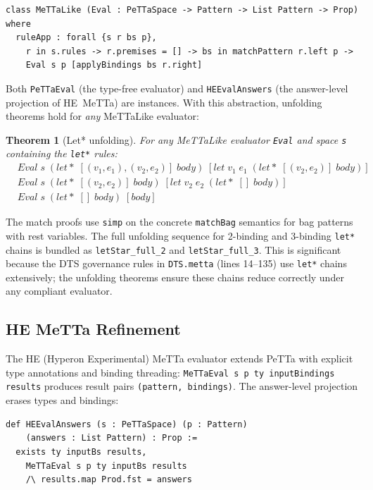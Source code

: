 \documentclass[]{article}
\newtheorem{theorem}{Theorem}
\newcommand{\code}[1]{\texttt{#1}}
\begin{document}
\begin{lstlisting}
class MeTTaLike (Eval : PeTTaSpace -> Pattern -> List Pattern -> Prop) where
  ruleApp : forall {s r bs p},
    r in s.rules -> r.premises = [] -> bs in matchPattern r.left p ->
    Eval s p [applyBindings bs r.right]
\end{lstlisting}

\noindent
Both \code{PeTTaEval} (the type-free evaluator) and \code{HEEvalAnswers}
(the answer-level projection of HE~MeTTa) are instances.
With this abstraction, unfolding theorems hold for \emph{any} MeTTaLike evaluator:

\begin{theorem}[Let* unfolding]
For any MeTTaLike evaluator \code{Eval} and space \code{s} containing the
\code{let*} rules:
\begin{align*}
  &\mathit{Eval}\;s\;(\mathit{let*}\;[(v_1, e_1), (v_2, e_2)]\;\mathit{body})
    \;[\mathit{let}\;v_1\;e_1\;(\mathit{let*}\;[(v_2, e_2)]\;\mathit{body})] \\
  &\mathit{Eval}\;s\;(\mathit{let*}\;[(v_2, e_2)]\;\mathit{body})
    \;[\mathit{let}\;v_2\;e_2\;(\mathit{let*}\;[]\;\mathit{body})] \\
  &\mathit{Eval}\;s\;(\mathit{let*}\;[]\;\mathit{body})\;[\mathit{body}]
\end{align*}
\end{theorem}

\noindent
The match proofs use \code{simp} on the concrete \code{matchBag} semantics
for bag patterns with rest variables.  The full unfolding sequence for
2-binding and 3-binding \code{let*} chains is bundled as
\code{letStar\_full\_2} and \code{letStar\_full\_3}.
This is significant because the DTS governance rules in
\code{DTS.metta} (lines 14--135) use \code{let*} chains extensively;
the unfolding theorems ensure these chains reduce correctly under
any compliant evaluator.

\subsection{HE MeTTa Refinement}

The HE (Hyperon Experimental) MeTTa evaluator extends PeTTa with explicit
type annotations and binding threading:
\code{MeTTaEval s p ty inputBindings results} produces result pairs
\code{(pattern, bindings)}.  The answer-level projection erases
types and bindings:

\begin{lstlisting}
def HEEvalAnswers (s : PeTTaSpace) (p : Pattern)
    (answers : List Pattern) : Prop :=
  exists ty inputBs results,
    MeTTaEval s p ty inputBs results
    /\ results.map Prod.fst = answers
\end{lstlisting}
\end{document}
